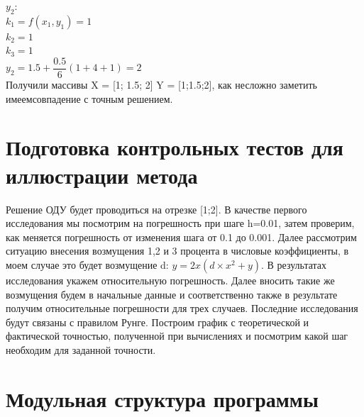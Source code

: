 \documentclass[a4paper]{article}
\begin{document}
 $y_2$:\\
$k_1 = f(x_1,y_1)=1$\\
$k_2 =1$\\
$k_3 =1$\\
$y_{2}=1.5+\dfrac{0.5}{6}(1+4+1)=2$\\
Получили массивы X = [1; 1.5; 2] Y = [1;1.5;2], как несложно заметить имеемсовпадение с точным решением.

 
\section{Подготовка контрольных тестов для иллюстрации метода} 

Решение ОДУ будет проводиться на отрезке [1;2]. В качестве первого исследования мы посмотрим на погрешность при шаге h=0.01, затем проверим, как меняется погрешность от изменения шага от 0.1 до 0.001. Далее рассмотрим ситуацию внесения возмущения 1,2 и 3 процента в числовые коэффициенты, в моем случае это будет возмущение d: 
$y = 2x(d \times x^2+y)$. В результатах исследования укажем относительную погрешность. Далее вносить такие же возмущения будем в начальные данные и соответственно также в результате получим относительные погрешности для трех случаев. Последние исследования будут связаны с правилом Рунге. Построим график с теоретической и фактической точностью, полученной при вычислениях и посмотрим какой шаг необходим для заданной точности. \\

\section{Модульная структура программы} 
 
\end{document}
